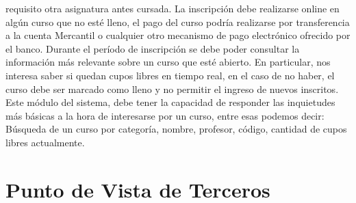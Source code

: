 \documentclass[12pt,a4paper,spanish]{article}
\begin{document}
requisito otra asignatura antes cursada. 
\newline
\newline
\indent La inscripci\'on debe realizarse online en alg\'un curso
que no est\'e lleno, el pago del curso podr\'ia realizarse por
transferencia a la cuenta Mercantil o cualquier otro mecanismo de pago
electr\'onico ofrecido por el banco.
\newline
\newline
\indent Durante el per\'iodo de inscripci\'on  se debe poder
consultar la informaci\'on m\'as relevante sobre un curso que est\'e
abierto. En particular, nos interesa saber si quedan cupos libres en
tiempo real, en el caso de no haber, el curso debe ser marcado como lleno y no permitir el ingreso de nuevos inscritos. 
\newline
\newline
\indent Este m\'odulo del sistema, debe tener la capacidad de
responder las inquietudes m\'as b\'asicas a la hora de interesarse por
un curso, entre esas podemos decir: B\'usqueda de un curso por
categor\'ia, nombre, profesor, c\'odigo, cantidad de cupos libres
actualmente. 
\newline
\newline
\newpage
\section{Punto de Vista de Terceros}
\end{document}
